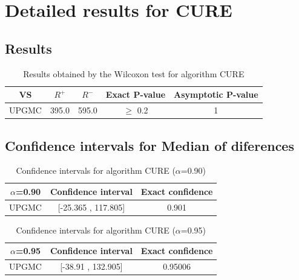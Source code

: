 \documentclass[a4paper,10pt]{article}
\begin{document}
 \clearpage 


\section{Detailed results for CURE}


\subsection{Results}

\begin{table}[!htp]
\centering\small
\begin{tabular}{
|c|c|c|c|c|}
\hline
 VS & $R^{+}$ & $R^{-}$ & Exact P-value & Asymptotic P-value \\ \hline 
UPGMC & 395.0 & 595.0 & $\geq$ 0.2 & 1\\ \hline 

\end{tabular}
\caption{Results obtained by the Wilcoxon test for algorithm CURE}
\end{table}

\subsection{Confidence intervals for Median of diferences}

\begin{table}[!htp]
\centering\small
\begin{tabular}{
|c|c|c|}
\hline
 $\alpha$=0.90 & Confidence interval & Exact confidence \\ \hline 
UPGMC & [-25.365 , 117.805] & 0.901\\ \hline 

\end{tabular}
\caption{Confidence intervals for algorithm CURE ($\alpha$=0.90)}
\end{table}
\begin{table}[!htp]
\centering\small
\begin{tabular}{
|c|c|c|}
\hline
 $\alpha$=0.95 & Confidence interval & Exact confidence \\ \hline 
UPGMC & [-38.91 , 132.905] & 0.95006\\ \hline 

\end{tabular}
\caption{Confidence intervals for algorithm CURE ($\alpha$=0.95)}
\end{table}

 \clearpage 
\end{document}
